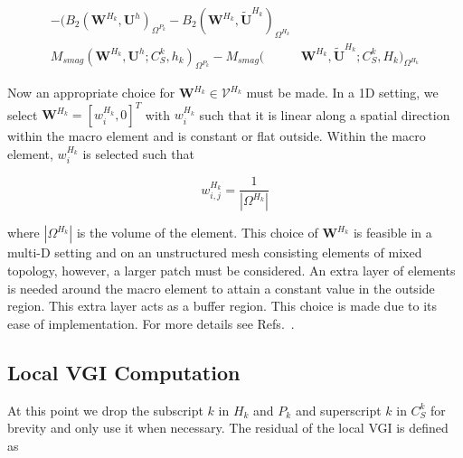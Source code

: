 \begin{equation}
	\label{eq:vgilb}
\begin{split}
-(B_2(\bm{W}^{H_k},\bm{U}^{h})_{\Omega^{P_k}} - B_2(\bm{W}^{H_k},\widetilde{\bm{U}}^{H_k})_{\Omega^{H_k}} \\
 M_{smag}(\bm{W}^{H_k},\bm{U}^{h}; C_S^k, h_k)_{\Omega^{P_k}} - M_{smag}(&\bm{W}^{H_k},\widetilde{\bm{U}}^{H_k} ; C_S^k, H_k)_{\Omega^{H_k}}
\end{split}
\end{equation}

Now an appropriate choice for $\bm{W}^{H_k} \in \bm{\mathcal{V}}^{H_k}$ must be made. 
In a 1D setting, we select
$\bm{W}^{H_k}=[w^{H_k}_i,0]^T$ with $w^{H_k}_i$
such that it is linear along a spatial direction within the
macro element and is constant or flat outside.
Within the macro element, $w^{H_k}_i$ is selected such that

\begin{equation}
\label{eq:wij}
w^{H_k}_{i,j} = \frac{1}{|\Omega^{H_k}|}
\end{equation}

\noindent where $|\Omega^{H_k}|$ is the volume of the
element. 
This choice of $\bm{W}^{H_k}$
is feasible in a multi-D setting and on an
unstructured mesh consisting elements of mixed topology,
however, a larger patch must be considered. An extra layer
of elements is needed around the macro element to attain a constant value
in the outside region. This extra layer acts as a buffer region.
This choice is made due to its ease of implementation.
For more details see Refs.~\cite{bib:tran2017b}.


\subsection{Local VGI Computation}
\label{sec:VGIComp}

At this point we drop the subscript $k$ in $H_k$ and $P_k$ and superscript
$k$ in $C_S^k$ for brevity and only use it when necessary.
The residual of the local VGI is defined as

